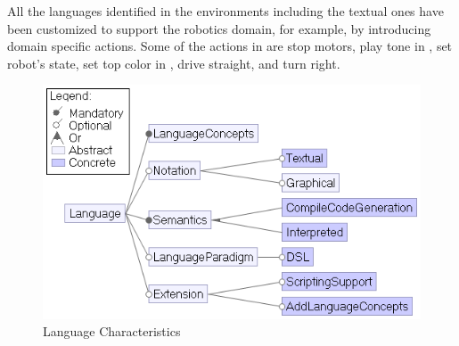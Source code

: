 All the languages identified in the environments including the textual ones have been customized to support the robotics domain, for example, by introducing domain specific actions. Some of the actions in \lego are stop motors, play tone in \trik, set robot's state, set top color in \aseba,  drive straight, and turn right. %

\begin{figure}[t]
     \centering
    \includegraphics[width=.75\columnwidth]{Languagefeatures.png}
      \caption{Language Characteristics}
      \label{fig:languagefeatures}
   \end{figure}

